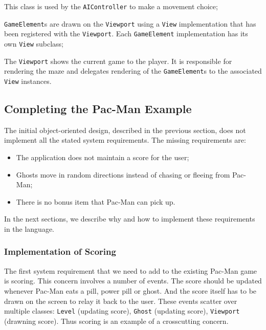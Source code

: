 \begin{description}[noitemsep,style=sameline,leftmargin=32mm]
	\item[Strategy] This class is used by the \lstinline|AIController| to make a movement choice;
	\item[View] \lstinline|GameElement|s are drawn on the \lstinline|Viewport| using a \lstinline|View| implementation 
		that has been registered with the \lstinline|Viewport|.	Each \lstinline|GameElement| implementation has	its own 
		\lstinline|View| subclass;
	\item[Viewport] The \lstinline|Viewport| shows the current game to the player. It is responsible for rendering 
		the maze and delegates rendering of the \lstinline|GameElement|s to the associated \lstinline|View| instances.
\end{description}

\subsection{Completing the Pac-Man Example}

The initial object-oriented design, described in the previous section, does not implement all the stated system requirements.
The missing requirements are:
\begin{itemize}[noitemsep]
  \samepage
  \item The application does not maintain a score for the user;
  \item Ghosts move in random directions instead of chasing or fleeing from Pac-Man;
  \item There is no bonus item that Pac-Man can pick up.
\end{itemize}
In the next sections, we describe why and how to implement these requirements in the \Compose* language.

\subsubsection{Implementation of Scoring}
\label{sec:scoring_concern}

The first system requirement that we need to add to the existing Pac-Man game is scoring.
This concern involves a number of events.
The score should be updated whenever Pac-Man eats a pill, power pill or ghost.
And the score itself has to be drawn on the screen to relay it back to the user.
These events scatter over multiple classes: \lstinline|Level| (updating score), \lstinline|Ghost| (updating score), \lstinline|Viewport| (drawning score).
Thus scoring is an example of a crosscutting concern. 

